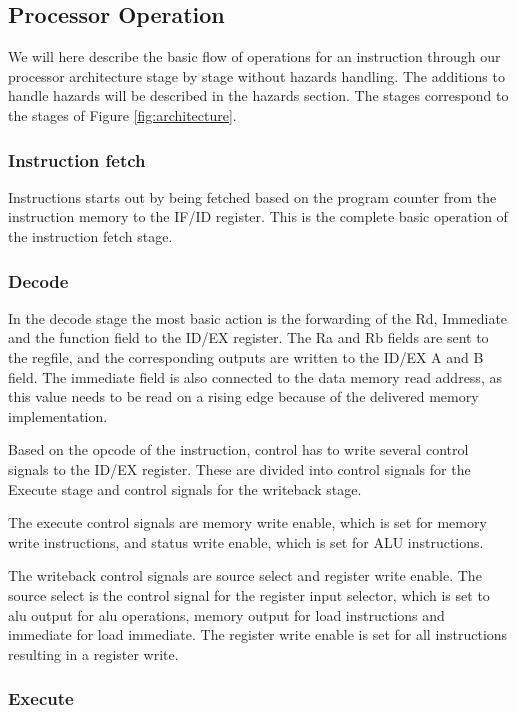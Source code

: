 \documentclass[11pt]{report}
\begin{document}
\subsection*{Processor Operation}
We will here describe the basic flow of operations for an instruction
through our processor architecture stage by stage without hazards handling.
The additions to handle hazards will be described in the hazards section.
The stages correspond to the stages of Figure \ref{fig:architecture}.

\subsubsection*{Instruction fetch}


Instructions starts out by being fetched based on the program counter from the
instruction memory to the IF/ID register. This is the complete basic operation of the 
instruction fetch stage.
\subsubsection*{Decode}

In the decode stage the most basic action is the forwarding of the Rd, Immediate and
the function field to the ID/EX register. The Ra and Rb fields are sent to the regfile, 
and the corresponding outputs are written to the ID/EX A and B field. 
The immediate field is also connected to the data memory read address, as this value
needs to be read on a rising edge because of the delivered memory implementation.

Based on the opcode of the instruction, control has to write several control signals 
to the ID/EX register. These are divided into control signals for the Execute stage
and control signals for the writeback stage.

The execute control signals are memory write enable, which is set for memory write instructions,
and status write enable, which is set for ALU instructions.

The writeback control signals are source select and register write enable. 
The source select is the control signal for the register input selector,
which is set to alu output for alu operations, memory output 
for load instructions and immediate for load immediate. 
The register write enable is set for all instructions resulting in a register write.

\subsubsection*{Execute}
\end{document}

